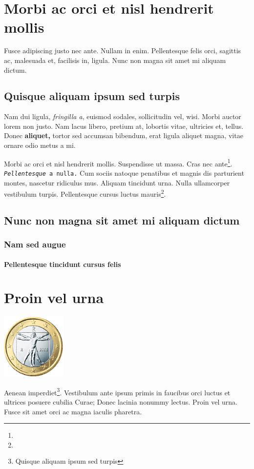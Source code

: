 \documentclass[cfonts]{nostarch}
\begin{document}
\chapter[Morbi ac orci]{Morbi ac orci et nisl hendrerit
  mollis}{} 

Fusce adipiscing justo nec ante. Nullam in enim.  Pellentesque felis
orci, sagittis ac, malesuada et, facilisis in, ligula. Nunc non magna
sit amet mi aliquam dictum.

\section{Quisque aliquam ipsum sed turpis}


Nam dui ligula, \emph{fringilla a}, euismod sodales, sollicitudin vel,
wisi.  Morbi auctor lorem non justo. Nam lacus libero, pretium at,
lobortis vitae, ultricies et, tellus. Donec \textbf{aliquet,} tortor
sed accumsan bibendum, erat ligula aliquet magna, vitae ornare odio
metus a mi.  

Morbi ac orci et nisl hendrerit mollis.  Suspendisse ut
massa. Cras nec ante\footnote{\lipsum[4]}. \texttt{{\itshape
    Pellentesque} a nulla.}  Cum sociis natoque penatibus et magnis
dis parturient montes, nascetur ridiculus mus. Aliquam
tincidunt urna.  Nulla ullamcorper vestibulum turpis.
Pellentesque cursus luctus mauris\footnote{\lipsum[3]}.

\lipsum[10]

\section{Nunc non magna sit amet mi aliquam dictum}

\lipsum[32-33]

\subsection{Nam sed augue}

\lipsum[34-35]

\subsubsection{Pellentesque tincidunt cursus felis}

\lipsum[36-37]

\chapter{Proin vel urna}{\includegraphics[width=1.264in]{100euroit}}

Aenean imperdiet\footnote{Quisque aliquam ipsum sed turpis}.
  Vestibulum ante ipsum pri\-m\-is in faucibus orci luctus et ultrices
  posuere cubilia Curae; Donec lacinia nonummy lectus. Proin vel urna.
  Fusce sit amet orci ac magna iaculis pharetra.

\lipsum[40-60]
\end{document}
